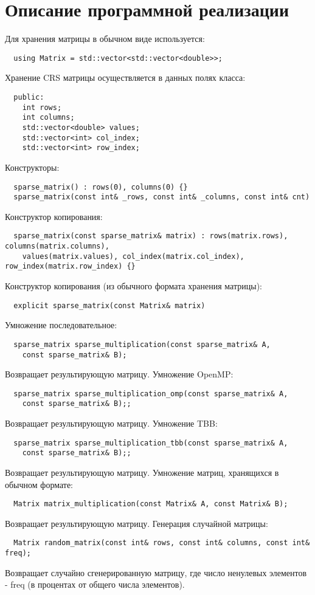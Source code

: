 \documentclass{report}
\begin{document}
\section* {Описание программной реализации}
Для хранения матрицы в обычном виде используется:
\begin{lstlisting}
  using Matrix = std::vector<std::vector<double>>;
\end{lstlisting}
Хранение CRS матрицы осуществляется в данных полях класса:
\begin{lstlisting}
  public:
    int rows;
    int columns;
    std::vector<double> values;
    std::vector<int> col_index;
    std::vector<int> row_index;
\end{lstlisting}
Конструкторы:
\begin{lstlisting}
  sparse_matrix() : rows(0), columns(0) {}
  sparse_matrix(const int& _rows, const int& _columns, const int& cnt)
\end{lstlisting}
Конструктор копирования:
\begin{lstlisting}
  sparse_matrix(const sparse_matrix& matrix) : rows(matrix.rows), columns(matrix.columns),
    values(matrix.values), col_index(matrix.col_index), row_index(matrix.row_index) {}
\end{lstlisting}
Конструктор копирования (из обычного формата хранения матрицы):
\begin{lstlisting}
  explicit sparse_matrix(const Matrix& matrix)
\end{lstlisting}
Умножение последовательное:
\begin{lstlisting}
  sparse_matrix sparse_multiplication(const sparse_matrix& A,
    const sparse_matrix& B);
\end{lstlisting}
Возвращает результирующую матрицу.
\newline
Умножение OpenMP:
\begin{lstlisting}
  sparse_matrix sparse_multiplication_omp(const sparse_matrix& A,
    const sparse_matrix& B);;
\end{lstlisting}
Возвращает результирующую матрицу.
\newline
Умножение TBB:
\begin{lstlisting}
  sparse_matrix sparse_multiplication_tbb(const sparse_matrix& A,
    const sparse_matrix& B);;
\end{lstlisting}
Возвращает результирующую матрицу.
\newline
Умножение матриц, хранящихся в обычном формате:
\begin{lstlisting}
  Matrix matrix_multiplication(const Matrix& A, const Matrix& B);
\end{lstlisting}
Возвращает результирующую матрицу.
\newline
Генерация случайной матрицы:
\begin{lstlisting}
  Matrix random_matrix(const int& rows, const int& columns, const int& freq);
\end{lstlisting}
Возвращает случайно сгенерированную матрицу, где число ненулевых элементов - freq (в процентах от общего числа элементов).
\end{document}
